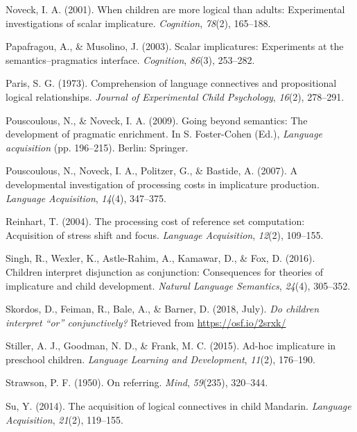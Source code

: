 \documentclass[floatsintext,man]{apa6}
\theoremstyle{definition}
\theoremstyle{definition}
\theoremstyle{definition}
\theoremstyle{remark}
\begin{document}
\hypertarget{ref-noveck2001children}{}
Noveck, I. A. (2001). When children are more logical than adults:
Experimental investigations of scalar implicature. \emph{Cognition},
\emph{78}(2), 165--188.

\hypertarget{ref-papafragou2003scalar}{}
Papafragou, A., \& Musolino, J. (2003). Scalar implicatures: Experiments
at the semantics--pragmatics interface. \emph{Cognition}, \emph{86}(3),
253--282.

\hypertarget{ref-paris1973comprehension}{}
Paris, S. G. (1973). Comprehension of language connectives and
propositional logical relationships. \emph{Journal of Experimental Child
Psychology}, \emph{16}(2), 278--291.

\hypertarget{ref-pouscoulous2009going}{}
Pouscoulous, N., \& Noveck, I. A. (2009). Going beyond semantics: The
development of pragmatic enrichment. In S. Foster-Cohen (Ed.),
\emph{Language acquisition} (pp. 196--215). Berlin: Springer.

\hypertarget{ref-pouscoulous2007developmental}{}
Pouscoulous, N., Noveck, I. A., Politzer, G., \& Bastide, A. (2007). A
developmental investigation of processing costs in implicature
production. \emph{Language Acquisition}, \emph{14}(4), 347--375.

\hypertarget{ref-reinhart2004processing}{}
Reinhart, T. (2004). The processing cost of reference set computation:
Acquisition of stress shift and focus. \emph{Language Acquisition},
\emph{12}(2), 109--155.

\hypertarget{ref-Singh2016}{}
Singh, R., Wexler, K., Astle-Rahim, A., Kamawar, D., \& Fox, D. (2016).
Children interpret disjunction as conjunction: Consequences for theories
of implicature and child development. \emph{Natural Language Semantics},
\emph{24}(4), 305--352.

\hypertarget{ref-skordosEtal2018}{}
Skordos, D., Feiman, R., Bale, A., \& Barner, D. (2018, July). \emph{Do
children interpret ``or'' conjunctively?} Retrieved from
\url{https://osf.io/2srxk/}

\hypertarget{ref-stiller2015ad}{}
Stiller, A. J., Goodman, N. D., \& Frank, M. C. (2015). Ad-hoc
implicature in preschool children. \emph{Language Learning and
Development}, \emph{11}(2), 176--190.

\hypertarget{ref-strawson1950referring}{}
Strawson, P. F. (1950). On referring. \emph{Mind}, \emph{59}(235),
320--344.

\hypertarget{ref-su2014acquisition}{}
Su, Y. (2014). The acquisition of logical connectives in child Mandarin.
\emph{Language Acquisition}, \emph{21}(2), 119--155.
\end{document}
